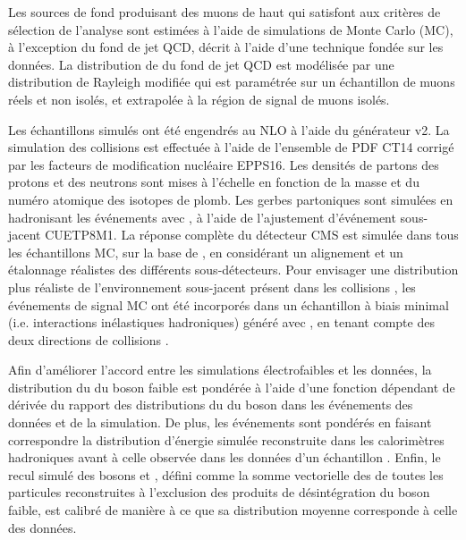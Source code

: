 Les sources de fond produisant des muons de haut \pt qui satisfont aux crit{\`e}res de s{\'e}lection de l'analyse sont estim{\'e}es {\`a} l'aide de simulations de Monte Carlo (MC), {\`a} l'exception du fond de jet QCD, d{\'e}crit {\`a} l'aide d'une technique fond{\'e}e sur les donn{\'e}es. La distribution de \ptmiss du fond de jet QCD est mod{\'e}lis{\'e}e par une distribution de Rayleigh modifi{\'e}e qui est param{\'e}tr{\'e}e sur un {\'e}chantillon de muons r{\'e}els et non isol{\'e}s, et extrapol{\'e}e {\`a} la r{\'e}gion de signal de muons isol{\'e}s.

Les {\'e}chantillons simul{\'e}s ont {\'e}t{\'e} engendr{\'e}s au NLO {\`a} l'aide du g{\'e}n{\'e}rateur \POWHEG v2. La simulation des collisions \pPb est effectu{\'e}e {\`a} l'aide de l'ensemble de PDF CT14 corrig{\'e} par les facteurs de modification nucl{\'e}aire EPPS16. Les densit{\'e}s de partons des protons et des neutrons sont mises {\`a} l'{\'e}chelle en fonction de la masse et du num{\'e}ro atomique des isotopes de plomb. Les gerbes partoniques sont simul{\'e}es en hadronisant les {\'e}v{\'e}nements \POWHEG avec , {\`a} l'aide de l'ajustement d'{\'e}v{\'e}nement sous-jacent CUETP8M1. La r{\'e}ponse compl{\`e}te du d{\'e}tecteur CMS est simul{\'e}e dans tous les {\'e}chantillons MC, sur la base de \GEANTfour, en consid{\'e}rant un alignement et un {\'e}talonnage r{\'e}alistes des diff{\'e}rents sous-d{\'e}tecteurs. Pour envisager une distribution plus r{\'e}aliste de l'environnement sous-jacent pr{\'e}sent dans les collisions \RunpPb, les {\'e}v{\'e}nements de signal MC ont {\'e}t{\'e} incorpor{\'e}s dans un {\'e}chantillon {\`a} biais minimal (i.e. interactions in{\'e}lastiques hadroniques) g{\'e}n{\'e}r{\'e} avec \EPOSLHC, en tenant compte des deux directions de collisions \RunpPb.

Afin d'am{\'e}liorer l'accord entre les simulations {\'e}lectrofaibles et les donn{\'e}es, la distribution du \pt du boson faible est pond{\'e}r{\'e}e {\`a} l'aide d'une fonction d{\'e}pendant de \pt d{\'e}riv{\'e}e du rapport des distributions du \pt du boson {\PZ} dans les {\'e}v{\'e}nements \ZToMuMu des donn{\'e}es et de la simulation. De plus, les {\'e}v{\'e}nements \pPb sont pond{\'e}r{\'e}s en faisant correspondre la distribution d'{\'e}nergie simul{\'e}e reconstruite dans les calorim{\`e}tres hadroniques avant {\`a} celle observ{\'e}e dans les donn{\'e}es d'un {\'e}chantillon \DYToMuMu. Enfin, le recul simul{\'e} des bosons {\PW} et {\PZ}, d{\'e}fini comme la somme vectorielle des \pt de toutes les particules reconstruites {\`a} l'exclusion des produits de d{\'e}sint{\'e}gration du boson faible, est calibr{\'e} de mani{\`e}re {\`a} ce que sa distribution moyenne corresponde {\`a} celle des donn{\'e}es.


